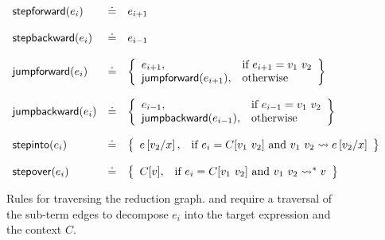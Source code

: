 \begin{figure}[t]
\centering
\[
\begin{array}{lcl}
\stepforward{e_i}  &\defeq& {e_{i+1}} \\ \\
\stepbackward{e_i} &\defeq& {e_{i-1}} \\ \\
\jumpforward{e_i} &\defeq& \left\{\begin{array}{ll}
                         e_{i+1}, & \text{if } e_{i+1} = \eapp{v_1}{v_2} \\
                         \jumpforward{e_{i+1}}, & \text{otherwise}
                         \end{array}\right\} \\ \\
\jumpbackward{e_i} &\defeq& \left\{\begin{array}{ll}
                         e_{i-1}, & \text{if } e_{i-1} = \eapp{v_1}{v_2} \\
                         \jumpbackward{e_{i-1}}, & \text{otherwise}
                         \end{array}\right\} \\ \\
\stepinto{e_i} &\defeq& \left\{\begin{array}{ll}
                         e\sub{x}{v_2}, & \text{if } e_i = C[\eapp{v_1}{v_2}] \text{ and } \singlestep{\eapp{v_1}{v_2}}{e\sub{x}{v_2}}
                         \end{array}\right\} \\ \\
\stepover{e_i} &\defeq& \left\{\begin{array}{ll}
                         C[v], & \text{if } e_i = C[\eapp{v_1}{v_2}] \text{ and } \multistep{\eapp{v_1}{v_2}}{v}
                         \end{array}\right\}
\end{array}
\]
\caption{Rules for traversing the reduction graph. \stepintosym and \stepoversym
  require a traversal of the sub-term edges to decompose $e_i$ into the
  target expression  and the context $C$.}
\label{fig:traversing-graph}
\end{figure}
